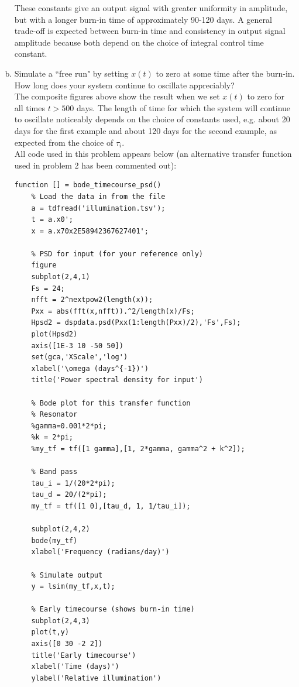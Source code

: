 \documentclass{article}
\begin{document}
\begin{enumerate}[a)]
{These constants give an output signal with greater uniformity in amplitude, but with a longer burn-in time of approximately 90-120 days. A general trade-off is expected between burn-in time and consistency in output signal amplitude because both depend on the choice of integral control time constant.
}

\item Simulate a ``free run" by setting $x(t)$ to zero at some time after the burn-in. How long does your system continue to oscillate appreciably?\\

{\color{red} The composite figures above show the result when we set $x(t)$ to zero for all times $t>500$ days. The length of time for which the system will continue to oscillate noticeably depends on the choice of constants used, e.g. about 20 days for the first example and about 120 days for the second example, as expected from the choice of $\tau_i$.\\

All code used in this problem appears below (an alternative transfer function used in problem 2 has been commented out):
}

\begin{lstlisting}
function [] = bode_timecourse_psd()
    % Load the data in from the file
    a = tdfread('illumination.tsv');
    t = a.x0';
    x = a.x70x2E58942367627401';

    % PSD for input (for your reference only)
    figure
    subplot(2,4,1)
    Fs = 24;
    nfft = 2^nextpow2(length(x));
    Pxx = abs(fft(x,nfft)).^2/length(x)/Fs;
    Hpsd2 = dspdata.psd(Pxx(1:length(Pxx)/2),'Fs',Fs);  
    plot(Hpsd2)
    axis([1E-3 10 -50 50])
    set(gca,'XScale','log')
    xlabel('\omega (days^{-1})')
    title('Power spectral density for input')
    
    % Bode plot for this transfer function
    % Resonator
    %gamma=0.001*2*pi;
    %k = 2*pi;
    %my_tf = tf([1 gamma],[1, 2*gamma, gamma^2 + k^2]);

    % Band pass
    tau_i = 1/(20*2*pi);
    tau_d = 20/(2*pi);
    my_tf = tf([1 0],[tau_d, 1, 1/tau_i]);
    
    subplot(2,4,2)
    bode(my_tf)
    xlabel('Frequency (radians/day)')
    
    % Simulate output
    y = lsim(my_tf,x,t);
    
    % Early timecourse (shows burn-in time)
    subplot(2,4,3)
    plot(t,y)
    axis([0 30 -2 2])
    title('Early timecourse')
    xlabel('Time (days)')
    ylabel('Relative illumination')
    

\end{lstlisting}
\end{enumerate}
\end{document}
